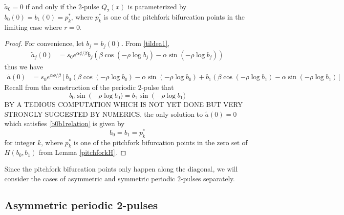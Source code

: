 \documentclass[thesis.tex]{subfiles}
\begin{document}
\begin{lemma}\label{lemma:tildea0zero}
$\tilde{a}_0 = 0$ if and only if the 2-pulse $Q_2(x)$ is parameterized by $b_0(0) = b_1(0) = p_k^*$, where $p_k^*$ is one of the pitchfork bifurcation points in the limiting case where $r = 0$.
\begin{proof}
For convenience, let $b_j = b_j(0)$. From \cref{tildea1},
\begin{align*}
\tilde{a}_j(0) &= s_0 e^{\alpha \phi/\beta} b_j \left( \beta \cos\left(-\rho \log b_j \right) - \alpha \sin \left(-\rho \log b_j \right) \right)
\end{align*}
thus we have
\begin{align}\label{tildea0}
\tilde{a}(0) &= s_0 e^{\alpha \phi/\beta}\left[ b_0 \left( \beta \cos\left(-\rho \log b_0 \right) - \alpha \sin \left(-\rho \log b_0 \right)  + b_1 \left( \beta \cos\left(-\rho \log b_1 \right) - \alpha \sin \left(-\rho \log b_1 \right) \right]
\end{align}
Recall from the construction of the periodic 2-pulse that
\begin{equation}\label{b0b1relation}
b_0 \sin \left(-\rho \log b_0) = b_1 \sin \left(-\rho \log b_1)
\end{equation}
BY A TEDIOUS COMPUTATION WHICH IS NOT YET DONE BUT VERY STRONGLY SUGGESTED BY NUMERICS, the only solution to $\tilde{a}(0) = 0$ which satisfies \cref{b0b1relation} is given by 
\[
b_0 = b_1 = p_k^*
\]
for integer $k$, where $p_k^*$ is one of the pitchfork bifurcation points in the zero set of $H(b_0, b_1)$ from Lemma \ref{pitchforkH}.
\end{proof}
\end{lemma}

Since the pitchfork bifurcation points only happen along the diagonal, we will consider the cases of asymmetric and symmetric periodic 2-pulses separately.

\subsection{Asymmetric periodic 2-pulses}
\end{document}
